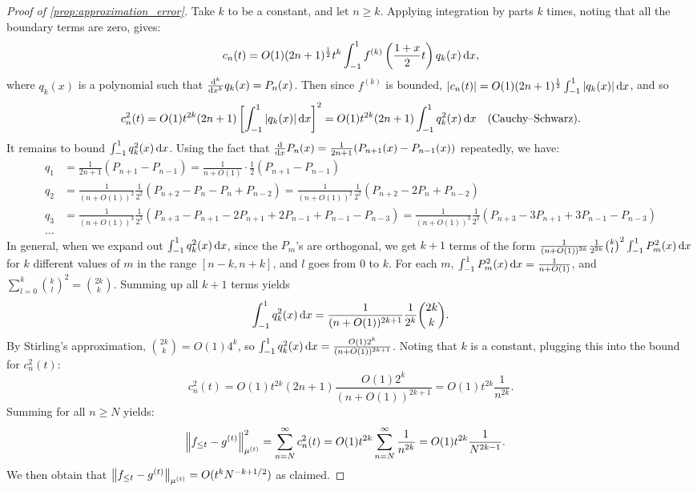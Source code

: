 \documentclass[../hippo.tex]{subfiles}
\begin{document}
\begin{proof}[Proof of \cref{prop:approximation_error}]
  Take $k$ to be a constant, and let $n \geq k$.
  Applying integration by parts $k$ times, noting that all the boundary
  terms are zero, gives:
  \begin{equation*}
    c_n(t) = O(1) (2n+1)^{\frac{1}{2}} t^k \int_{-1}^{1} f^{(k)} \left( \frac{1+x}{2} t \right) q_k(x) \mathop{}\!\mathrm{d} x,
  \end{equation*}
  where $q_k(x)$ is a polynomial such that $\frac{\mathop{}\!\mathrm{d}^k}{\mathop{}\!\mathrm{d} x^k} q_k(x) = P_n(x)$.
  Then since $f^{(k)}$ is bounded,
  $\left\lvert c_n(t)\right\rvert = O(1) (2n+1)^{\frac{1}{2}} \int_{-1}^{1} \left\lvert q_k(x)\right\rvert \mathop{}\!\mathrm{d} x$, and so
  \begin{equation*}
    c_n^2(t) = O(1) t^{2k} (2n+1) \left[ \int_{-1}^{1} \left\lvert q_k(x)\right\rvert \mathop{}\!\mathrm{d} x \right]^2 = O(1) t^{2k} (2n+1) \int_{-1}^{1} q_k^2(x) \mathop{}\!\mathrm{d} x \quad \text{(Cauchy--Schwarz)}.
  \end{equation*}
  It remains to bound $\int_{-1}^{1} q_k^2(x) \mathop{}\!\mathrm{d} x$.
  Using the fact that
  $\frac{\mathop{}\!\mathrm{d}}{\mathop{}\!\mathrm{d} x} P_n(x) = \frac{1}{2n+1} (P_{n+1}(x) - P_{n-1}(x))$ repeatedly, we have:
  \begin{align*}
    q_1 &= \frac{1}{2n+1} (P_{n+1} - P_{n-1}) = \frac{1}{n+O(1)} \cdot \frac{1}{2} (P_{n+1} - P_{n-1}) \\
    q_2 &= \frac{1}{(n+O(1))^2} \frac{1}{2^2} (P_{n+2} - P_n - P_n + P_{n-2}) = \frac{1}{(n+O(1))^2} \frac{1}{2^2} (P_{n+2} - 2P_n + P_{n-2}) \\
    q_3 &= \frac{1}{(n+O(1))^3} \frac{1}{2^3} (P_{n+3} - P_{n+1} - 2P_{n+1} + 2P_{n-1} + P_{n-1} - P_{n-3}) = \frac{1}{(n+O(1))^3} \frac{1}{2^3} (P_{n+3} - 3P_{n+1} + 3P_{n-1} - P_{n-3}) \\
    \dots
  \end{align*}
  In general, when we expand out $\int_{-1}^{1} q_k^2(x) \mathop{}\!\mathrm{d} x$, since the $P_m$'s
  are orthogonal, we get $k+1$ terms of the form
  $\frac{1}{(n+O(1))^{2k}} \frac{1}{2^{2k}} \binom{k}{l}^2 \int_{-1}^{1} P_m^2(x) \mathop{}\!\mathrm{d} x$
  for $k$ different values of $m$ in the range $[n-k, n+k]$, and $l$ goes from 0 to $k$.
  For each $m$, $\int_{-1}^{1} P_m^2(x) \mathop{}\!\mathrm{d} x = \frac{1}{n+O(1)}$, and
  $\sum_{l=0}^{k} \binom{k}{l}^2 = \binom{2k}{k}$.
  Summing up all $k+1$ terms yields
  \begin{equation*}
    \int_{-1}^{1} q_k^2(x) \mathop{}\!\mathrm{d} x = \frac{1}{(n+O(1))^{2k+1}} \frac{1}{2^k} \binom{2k}{k}.
  \end{equation*}
  By Stirling's approximation, $\binom{2k}{k} = O(1) 4^k$, so
  $\int_{-1}^{1} q_k^2(x) \mathop{}\!\mathrm{d} x = \frac{O(1) 2^k}{(n+O(1))^{2k+1}}$.
  Noting that $k$ is a constant, plugging this into the bound for $c_n^2(t)$:
  \begin{equation*}
    c_n^2(t) = O(1) t^{2k} (2n+1) \frac{O(1)2^k}{(n+O(1))^{2k+1}} = O(1) t^{2k} \frac{1}{n^{2k}}.
  \end{equation*}
  Summing for all $n \geq N$ yields:
  \begin{align*}
    \left\|{f_{\leq t} - g^{(t)}}\right\|^2_{\mu^{(t)}}
    &= \sum_{n=N}^{\infty} c_n^2(t) = O(1) t^{2k} \sum_{n=N}^{\infty} \frac{1}{n^{2k}} = O(1) t^{2k} \frac{1}{N^{2k-1}}.
  \end{align*}
  We then obtain that $\left\|{f_{\leq t} - g^{(t)}}\right\|_{\mu^{(t)}} = O(t^k N^{-k+1/2})$ as claimed.
\end{proof}
\end{document}
